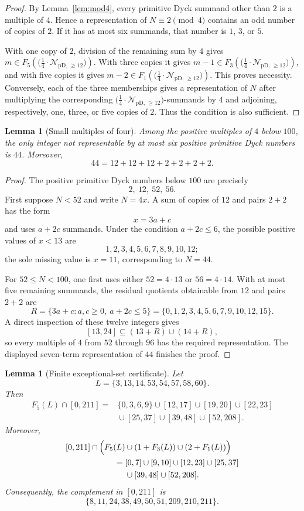 \documentclass[12pt]{article}
\theoremstyle{plain}
\newtheorem{lemma}[theorem]{Lemma}
\newcommand{\Pset}{\bigl(\tfrac14\cdot
  \mathcal{N}_{\mathrm{pD},\,\geq12}\bigr)}
\begin{document}
\begin{proof}
By Lemma~\ref{lem:mod4}, every primitive Dyck summand other than $2$ is
a multiple of $4$.  Hence a representation of $N\equiv2\pmod 4$ contains
an odd number of copies of $2$.  If it has at most six summands, that
number is $1$, $3$, or $5$.

With one copy of $2$, division of the remaining sum by $4$ gives
$m\in F_5(\Pset)$.  With three copies it gives
$m-1\in F_3(\Pset)$, and with five copies it gives
$m-2\in F_1(\Pset)$.  This proves necessity.  Conversely, each of the
three memberships gives a representation of $N$ after multiplying the
corresponding $\Pset$-summands by $4$ and adjoining, respectively, one,
three, or five copies of $2$.  Thus the condition is also sufficient.
\end{proof}

\begin{lemma}[Small multiples of four]\label{lem:smallmultiples}
Among the positive multiples of $4$ below $100$, the only integer not
representable by at most six positive primitive Dyck numbers is $44$.
Moreover,
\[
 44=12+12+12+2+2+2+2.
\]
\end{lemma}

\begin{proof}
The positive primitive Dyck numbers below $100$ are precisely
\[
 2,\ 12,\ 52,\ 56.
\]
First suppose $N<52$ and write $N=4x$.  A sum of copies of $12$ and
pairs $2+2$ has the form
\[
 x=3a+c
\]
and uses $a+2c$ summands.  Under the condition $a+2c\leq6$, the possible
positive values of $x<13$ are
\[
 1,2,3,4,5,6,7,8,9,10,12;
\]
the sole missing value is $x=11$, corresponding to $N=44$.

For $52\leq N<100$, one first uses either $52=4\cdot13$ or
$56=4\cdot14$.  With at most five remaining summands, the residual
quotients obtainable from $12$ and pairs $2+2$ are
\[
 R=\{3a+c:a,c\geq0,\ a+2c\leq5\}
   =\{0,1,2,3,4,5,6,7,9,10,12,15\}.
\]
A direct inspection of these twelve integers gives
\[
 [13,24]\subseteq(13+R)\cup(14+R),
\]
so every multiple of $4$ from $52$ through $96$ has the required
representation.  The displayed seven-term representation of $44$
finishes the proof.
\end{proof}

\begin{lemma}[Finite exceptional-set certificate]\label{lem:finiteexception}
Let
\[
 L=\{3,13,14,53,54,57,58,60\}.
\]
Then
\[
\begin{aligned}
F_5(L)\cap[0,211]
={}&\{0,3,6,9\}\cup[12,17]\cup[19,20]\cup[22,23]\\
 &{}\cup[25,37]\cup[39,48]\cup[52,208].
\end{aligned}
\]
Moreover,
\[
\begin{aligned}
[0,211]\cap\Bigl(F_5(L)&\cup(1+F_3(L))\cup(2+F_1(L))\Bigr)\\
={}&[0,7]\cup[9,10]\cup[12,23]\cup[25,37]\\
 &{}\cup[39,48]\cup[52,208].
\end{aligned}
\]
Consequently, the complement in $[0,211]$ is
\[
 \{8,11,24,38,49,50,51,209,210,211\}.
\]
\end{lemma}
\end{document}

